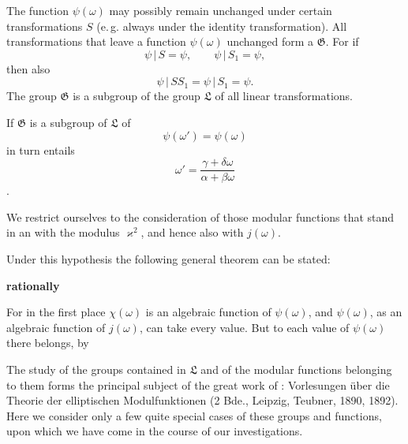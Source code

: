 The function $\psi(\omega)$ may possibly remain unchanged under certain
 transformations $S$ (e.\,g. always under the identity
 transformation). All transformations that leave a function
 $\psi(\omega)$ unchanged form a  $\mathfrak{G}$. For if
\[
\psi\,|\,S = \psi, \qquad \psi\,|\,S_1 = \psi,
\]
then also
\[
\psi\,|\,SS_1 = \psi\,|\,S_1 = \psi.
\]
The group $\mathfrak{G}$ is a subgroup of the group $\mathfrak{L}$ of all linear
transformations.

If $\mathfrak{G}$ is a subgroup of $\mathfrak{L}$ of 
\[
\psi(\omega') = \psi(\omega)
\]
in turn entails 
\[
\omega' = \frac{\gamma+\delta\omega}{\alpha+\beta\omega}
\]
.

We restrict ourselves to the consideration of those modular functions
that stand in an  with the modulus $\varkappa^2$, and hence also with $j(\omega)$.

Under this hypothesis the following general theorem can be
stated:

\textbf{rationally} 

For in the first place $\chi(\omega)$ is an algebraic function of $\psi(\omega)$,
and $\psi(\omega)$, as an algebraic function of $j(\omega)$, can take every
value. But to each value of $\psi(\omega)$ there belongs, by 

The study of the groups contained in $\mathfrak{L}$ and of the modular
functions belonging to them forms the principal subject of the great
work of : \glqq Vorlesungen über die Theorie
der elliptischen Modulfunktionen\grqq{} (2 Bde., Leipzig, Teubner,
1890, 1892). Here we consider only a few quite special cases
of these groups and functions, upon which we have come in the course of our
investigations.
